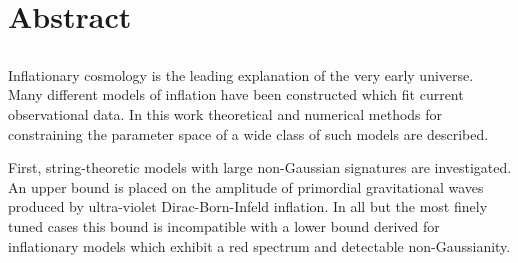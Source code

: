 \renewcommand{\CVSrevision}{\version$Id: abstract.tex,v 1.12 2009/10/15 17:35:05 ith Exp $}
% 
% 
\chapter*{Abstract}
\label{ch:abstract}
\section*{}
\singlespacing
Inflationary cosmology is the leading explanation of the very early universe. 
Many different models of inflation have been constructed which fit current observational data.
In this work theoretical and numerical methods for constraining the parameter space of a wide class
of such models are described.

First, string-theoretic models with large non-Gaussian signatures are investigated.
An upper bound is placed on the amplitude of primordial gravitational waves produced by ultra-violet
Dirac-Born-Infeld inflation. In all but the most finely tuned cases this bound is incompatible with
a lower bound derived for inflationary models which exhibit a red spectrum and detectable
non-Gaussianity. 

